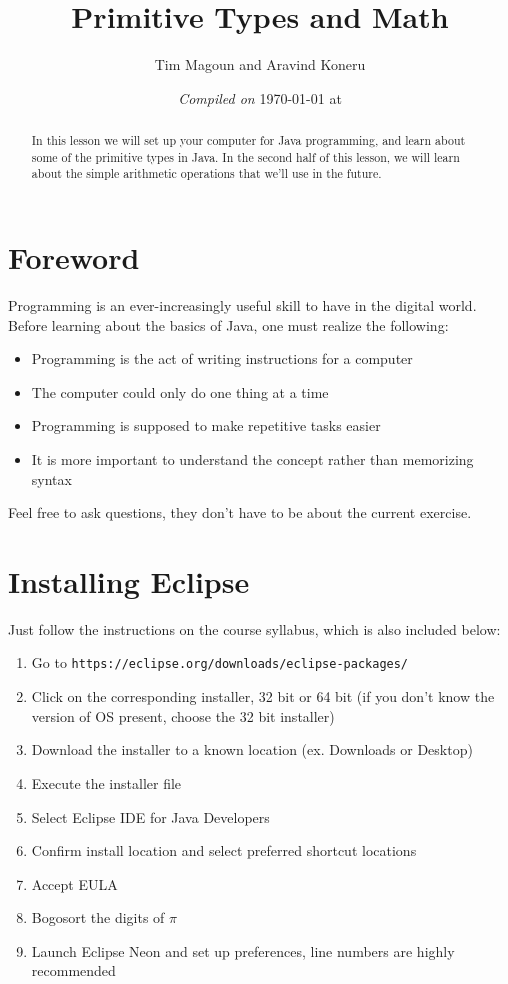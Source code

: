 \documentclass[11pt,fleqn]{article}
\begin{document}
\title{Primitive Types and Math}%
\author{Tim Magoun and Aravind Koneru}
\date{\textit{Compiled on} \today \hspace{1mm} at \currenttime}
\maketitle

\begin{abstract}
In this lesson we will set up your computer for Java programming, and learn about some of the primitive
types in Java. In the second half of this lesson, we will learn about the simple arithmetic operations that we'll use in the future.
\end{abstract}

\section*{Foreword}
Programming is an ever-increasingly useful skill to have in the digital world. Before learning about the
basics of Java, one must realize the following:
\begin{itemize}
\item Programming is the act of writing instructions for a computer
\item The computer could only do one thing at a time
\item Programming is supposed to make repetitive tasks easier
\item It is more important to understand the concept rather than memorizing syntax
\end{itemize}
Feel free to ask questions, they don't have to be about the current exercise.

\newpage
\section{Installing Eclipse}
Just follow the instructions on the course syllabus, which is also included below:
\begin{enumerate}
\item Go to \texttt{https://eclipse.org/downloads/eclipse-packages/}
\item Click on the corresponding installer, 32 bit or 64 bit (if you don't know the version of OS present, choose the 32 bit installer)
\item Download the installer to a known location (ex. Downloads or Desktop)
\item Execute the installer file
\item Select Eclipse IDE for Java Developers
\item Confirm install location and select preferred shortcut locations
\item Accept EULA
\item Bogosort the digits of $\pi$
\item Launch Eclipse Neon and set up preferences, line numbers are highly recommended
\end{enumerate}
\end{document}
